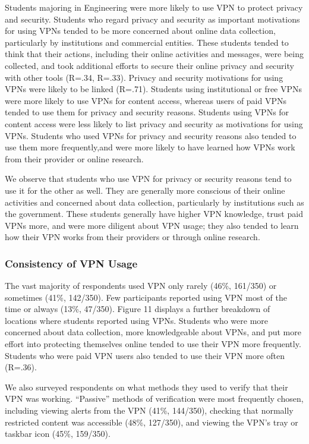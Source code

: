 Students majoring in Engineering were more likely to use VPN to protect privacy and security. Students who regard privacy and security as important motivations for using VPNs tended to be more concerned about online data collection, particularly by institutions and commercial entities. These students tended to think that their actions, including their online activities and messages, were being collected, and took additional efforts to secure their online privacy and security with other tools (R=.34, R=.33). Privacy and security motivations for using VPNs were likely to be linked (R=.71). Students using institutional or free VPNs were more likely to use VPNs for content access, whereas users of paid VPNs tended to use them for privacy and security reasons. Students using VPNs for content access were less likely to list privacy and security as motivations for using VPNs. Students who used VPNs for privacy and security reasons also tended to use them more frequently,and were more likely to have learned how VPNs work from their provider or online research. 

We observe that students who use VPN for privacy or security reasons tend to use it for the other as well. They are generally more conscious of their online activities and concerned about data collection, particularly by institutions such as the government. These students generally have higher VPN knowledge, trust paid VPNs more, and were more diligent about VPN usage; they also tended to learn how their VPN works from their providers or through online research.

\subsubsection{Consistency of VPN Usage}

The vast majority of respondents used VPN only rarely (46\%, 161/350) or sometimes (41\%, 142/350). Few participants reported using VPN most of the time or always (13\%, 47/350). Figure 11 displays a further breakdown of locations where students reported using VPNs. Students who were more concerned about data collection, more knowledgeable about VPNs, and put more effort into protecting themselves online tended to use their VPN more frequently. Students who were paid VPN users also tended to use their VPN more often (R=.36).

We also surveyed respondents on what methods they used to verify that their VPN was working. “Passive” methods of verification were most frequently chosen, including viewing alerts from the VPN (41\%, 144/350), checking that normally restricted content was accessible (48\%, 127/350), and viewing the VPN’s tray or taskbar icon (45\%, 159/350).

